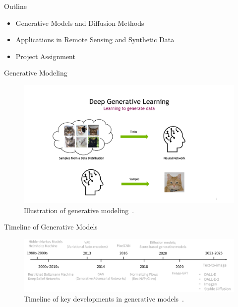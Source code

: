 
\begin{refsection}
  \begin{frame}{Outline}
    \begin{itemize}
      \item Generative Models and Diffusion Methods
      \item Applications in Remote Sensing and Synthetic Data
      \item Project Assignment
    \end{itemize}
  \end{frame}
\end{refsection}

\begin{refsection}
\begin{frame}{Generative Modeling}
  \begin{figure}
    \centering
    \includegraphics[width=0.8\linewidth]{figs/learning_to_generate_data.png}
    \caption{\scriptsize Illustration of generative modeling~\parencite{CVPR2023Tutorial}.}
  \end{figure}
  \bottomleftrefs
\end{frame}
\end{refsection}

\begin{refsection}
\begin{frame}{Timeline of Generative Models}
  \begin{figure}
    \centering
    \includegraphics[width=0.95\linewidth]{figs/genai_timeline.png}
    \caption{\scriptsize Timeline of key developments in generative models~\parencite{dengPPTAdvancedNueralNetwork2024}.}
  \end{figure}
  \bottomleftrefs
\end{frame}
\end{refsection}


